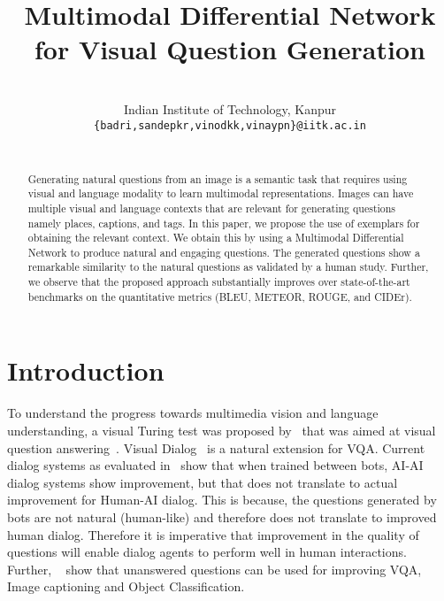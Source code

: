 \documentclass[11pt,a4paper]{article}
\title{Multimodal Differential Network for Visual Question Generation}
\author{   \quad  \quad  \quad   \\
  Indian Institute of Technology, Kanpur \\
{\tt \{badri,sandepkr,vinodkk,vinaypn\}@iitk.ac.in} \\
\\}
\date{}
\begin{document}
\maketitle



\begin{abstract}

Generating natural questions from an image is a semantic task that requires using visual and language modality to learn multimodal representations. Images can have multiple visual and language contexts that are relevant for generating questions namely places, captions, and tags. In this paper, we propose the use of exemplars for obtaining the relevant context.
We obtain this by using a Multimodal Differential Network to produce natural and engaging questions. The generated questions show a remarkable similarity to the natural questions as validated by a human study. 
Further, we observe that the proposed approach substantially improves over state-of-the-art benchmarks on the quantitative metrics (BLEU, METEOR, ROUGE, and CIDEr).

\end{abstract}


\section{Introduction}\label{intro}
To understand the progress towards multimedia vision and language understanding, 
a visual Turing test was proposed by~\cite{Geman_PNAS2015} that was aimed at visual question answering~\cite{VQA}. Visual Dialog~\cite{visdial} is a natural extension for VQA. Current dialog systems as evaluated in~\cite{visdial_eval} show that when trained between bots, AI-AI dialog systems show improvement, but that does not translate to actual improvement for Human-AI dialog. This is because, the questions generated by bots are not natural (human-like) and therefore does not translate to improved human dialog. Therefore it is imperative that improvement in the quality of questions will enable dialog agents to perform well in human interactions. Further, ~\cite{GanjuCVPR17} show that unanswered questions can be used for improving VQA, Image captioning and Object Classification. 
\end{document}

